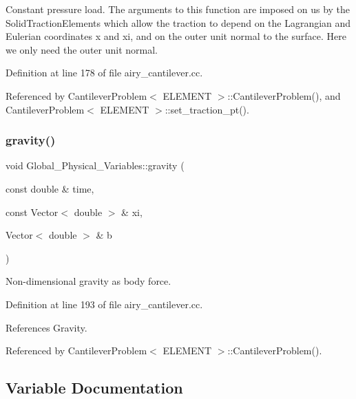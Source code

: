 Constant pressure load. The arguments to this function are imposed on us by the Solid\+Traction\+Elements which allow the traction to depend on the Lagrangian and Eulerian coordinates x and xi, and on the outer unit normal to the surface. Here we only need the outer unit normal. 



Definition at line 178 of file airy\+\_\+cantilever.\+cc.



Referenced by Cantilever\+Problem$<$ E\+L\+E\+M\+E\+N\+T $>$\+::\+Cantilever\+Problem(), and Cantilever\+Problem$<$ E\+L\+E\+M\+E\+N\+T $>$\+::set\+\_\+traction\+\_\+pt().

\mbox{\label{namespaceGlobal__Physical__Variables_a0777aef63372db7f91ad894c38159681}} 
\subsubsection{\texorpdfstring{gravity()}{gravity()}}
{\footnotesize\ttfamily void Global\+\_\+\+Physical\+\_\+\+Variables\+::gravity (\begin{DoxyParamCaption}\item[{const double \&}]{time,  }\item[{const Vector$<$ double $>$ \&}]{xi,  }\item[{Vector$<$ double $>$ \&}]{b }\end{DoxyParamCaption})}



Non-\/dimensional gravity as body force. 



Definition at line 193 of file airy\+\_\+cantilever.\+cc.



References Gravity.



Referenced by Cantilever\+Problem$<$ E\+L\+E\+M\+E\+N\+T $>$\+::\+Cantilever\+Problem().



\subsection{Variable Documentation}
\mbox{\label{namespaceGlobal__Physical__Variables_a849754fa7155c1a31481674ce4845658}} 
